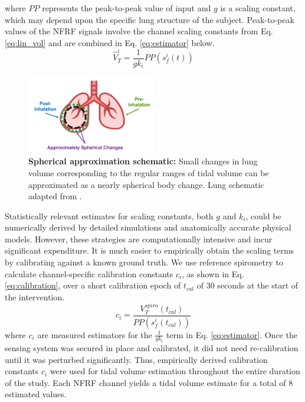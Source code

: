 \documentclass[journal]{IEEEtran}
\begin{document}
where $PP$ represents the peak-to-peak value of input and $g$ is a scaling constant, which may depend upon the specific lung structure of the subject. Peak-to-peak values of the NFRF signals involve the channel scaling constants from Eq. \ref{eq:lin_vol} and are combined in Eq. \ref{eq:estimator} below. 
\begin{equation}
    \hat{V}^{i}_{T} = \frac{1}{g k_i} PP(s_f^{i} (t))
    \label{eq:estimator}
\end{equation}
\begin{figure}[htbp]
    \centering
    \includegraphics[width=0.5\textwidth]{approx_sphere_v2.jpg}
    \caption{\textbf{Spherical approximation schematic:} Small changes in lung volume corresponding to the regular ranges of tidal volume can be approximated as a nearly spherical body change. Lung schematic adapted from \cite{lungImage}.}
    \label{fig:approx_sphere}
\end{figure}
\hspace{-0.5em}Statistically relevant estimates for scaling constants, both $g$ and $k_{i}$, could be numerically derived by detailed simulations and anatomically accurate physical models. However, these strategies are computationally intensive and incur significant expenditure. It is much easier to empirically obtain the scaling terms by calibrating against a known ground truth. We use reference spirometry to calculate channel-specific calibration constants $c_{i}$, as shown in Eq. \ref{eq:calibration}, over a short calibration epoch of $t_{cal}$ of 30 seconds at the start of the intervention. 
\begin{equation}
        c_{i} = \frac{V^{spiro}_{T}(t_{cal})}{PP(s_f^{i} (t_{cal}))} 
    \label{eq:calibration}
\end{equation}
where $c_{i}$ are measured estimators for the $\frac{1}{gk_i}$ term in Eq. \ref{eq:estimator}. Once the sensing system was secured in place and calibrated, it did not need re-calibration until it was perturbed significantly. Thus, empirically derived calibration constants $c_i$ were used for tidal volume estimation throughout the entire duration of the study. Each NFRF channel yields a tidal volume estimate for a total of 8 estimated values.
\end{document}
